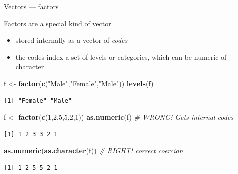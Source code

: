\documentclass[10pt,ignorenonframetext,compress, aspectratio=169]{beamer}
\newenvironment{Shaded}{\begin{snugshade}}{\end{snugshade}}
\newcommand{\KeywordTok}[1]{\textcolor[rgb]{0.13,0.29,0.53}{\textbf{{#1}}}}
\newcommand{\DecValTok}[1]{\textcolor[rgb]{0.00,0.00,0.81}{{#1}}}
\newcommand{\StringTok}[1]{\textcolor[rgb]{0.31,0.60,0.02}{{#1}}}
\newcommand{\CommentTok}[1]{\textcolor[rgb]{0.56,0.35,0.01}{\textit{{#1}}}}
\newcommand{\NormalTok}[1]{{#1}}
\begin{document}
\begin{frame}[fragile]{Vectors --- factors}

Factors are a special kind of vector

\begin{itemize}
\itemsep1pt\parskip0pt
\item
  stored internally as a vector of \emph{codes}
\item
  the codes index a set of \alert{levels} or categories, which can be
  numeric of character
\end{itemize}

\scriptsize

\begin{Shaded}
\begin{Highlighting}[]
\NormalTok{f <-}\StringTok{ }\KeywordTok{factor}\NormalTok{(}\KeywordTok{c}\NormalTok{(}\StringTok{"Male"}\NormalTok{,}\StringTok{"Female"}\NormalTok{,}\StringTok{"Male"}\NormalTok{))}
\KeywordTok{levels}\NormalTok{(f)}
\end{Highlighting}
\end{Shaded}

\begin{verbatim}
[1] "Female" "Male"  
\end{verbatim}

\begin{Shaded}
\begin{Highlighting}[]
\NormalTok{f <-}\StringTok{ }\KeywordTok{factor}\NormalTok{(}\KeywordTok{c}\NormalTok{(}\DecValTok{1}\NormalTok{,}\DecValTok{2}\NormalTok{,}\DecValTok{5}\NormalTok{,}\DecValTok{5}\NormalTok{,}\DecValTok{2}\NormalTok{,}\DecValTok{1}\NormalTok{))}
\KeywordTok{as.numeric}\NormalTok{(f)                           }\CommentTok{# WRONG! Gets internal codes}
\end{Highlighting}
\end{Shaded}

\begin{verbatim}
[1] 1 2 3 3 2 1
\end{verbatim}

\begin{Shaded}
\begin{Highlighting}[]
\KeywordTok{as.numeric}\NormalTok{(}\KeywordTok{as.character}\NormalTok{(f))             }\CommentTok{# RIGHT! correct coercion}
\end{Highlighting}
\end{Shaded}

\begin{verbatim}
[1] 1 2 5 5 2 1
\end{verbatim}

\normalsize

\end{frame}
\end{document}
